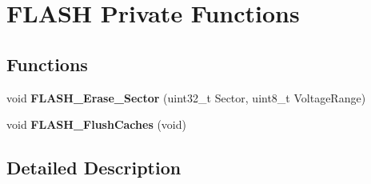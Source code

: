 \hypertarget{group___f_l_a_s_h_ex___private___functions}{}\section{F\+L\+A\+SH Private Functions}
\label{group___f_l_a_s_h_ex___private___functions}
\subsection*{Functions}
\begin{DoxyCompactItemize}
\item 
\mbox{\label{group___f_l_a_s_h_ex___private___functions_ga98c9d95cedcc4bfd39cdee82d07c0792}} 
void {\bfseries F\+L\+A\+S\+H\+\_\+\+Erase\+\_\+\+Sector} (uint32\+\_\+t Sector, uint8\+\_\+t Voltage\+Range)
\item 
\mbox{\label{group___f_l_a_s_h_ex___private___functions_ga0881881ce55e54e123206bc2e0dc62f3}} 
void {\bfseries F\+L\+A\+S\+H\+\_\+\+Flush\+Caches} (void)
\end{DoxyCompactItemize}


\subsection{Detailed Description}
